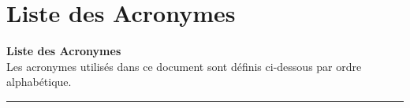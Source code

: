 \chapter*{Liste des Acronymes}

\thispagestyle{fancy}
\pagestyle{fancy}

\begin{center}
\vspace*{1cm}
{\Large\bfseries Liste des Acronymes}\\[0.5cm]
{\small Les acronymes utilisés dans ce document sont définis ci-dessous par ordre alphabétique.}\\[1cm]
\end{center}

\noindent\rule{\textwidth}{1pt}\\[0.5cm]

